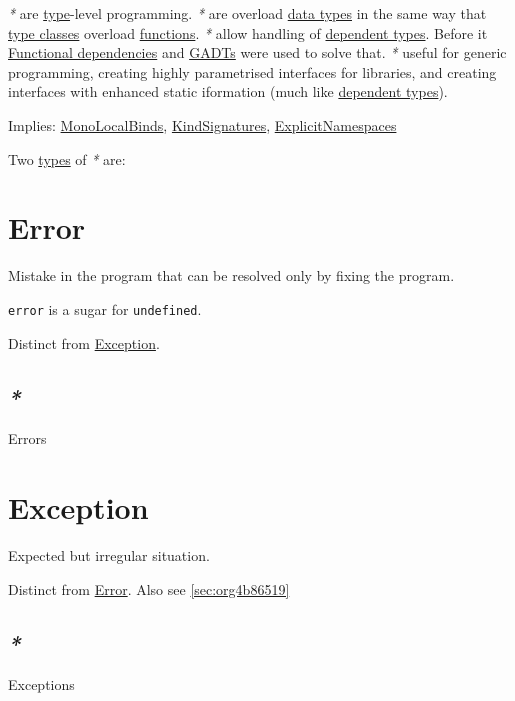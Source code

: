 \documentclass[a4paper,14pt,oneside]{book}
\begin{document}
\emph{*} are \hyperref[org99e5c3b]{type}-level programming.
\emph{*} are overload \hyperref[orgb916730]{data types} in the same way that \hyperref[org8141be4]{type classes} overload \hyperref[org196c7cc]{functions}.
\emph{*} allow handling of \hyperref[org6882e8b]{dependent types}. Before it \hyperref[org68ec744]{Functional dependencies} and \hyperref[org7905114]{GADTs} were used to solve that.
\emph{*} useful for generic programming, creating highly parametrised interfaces for libraries, and creating interfaces with enhanced static iformation (much like \hyperref[org6882e8b]{dependent types}).

Implies: \hyperref[org75e6039]{MonoLocalBinds}, \hyperref[org4e9d115]{KindSignatures}, \hyperref[org89455c0]{ExplicitNamespaces}

Two \hyperref[org90f7adb]{types} of \emph{*} are:

\chapter{\label{org7c8942a}Error}
\label{sec:orgb58a0bb}
Mistake in the program that can be resolved only by fixing the program.

\texttt{error} is a sugar for \texttt{undefined}.

Distinct from \hyperref[orga34d850]{Exception}.

\section{\emph{*}}
\label{sec:org2a45133}

\label{orgdf09960}Errors

\chapter{\label{orga34d850}Exception}
\label{sec:orga2f5478}
Expected but irregular situation.

Distinct from \hyperref[org7c8942a]{Error}. Also see \ref{sec:org4b86519}

\section{\emph{*}}
\label{sec:org4ba3e78}

\label{org92013ae}Exceptions
\end{document}
